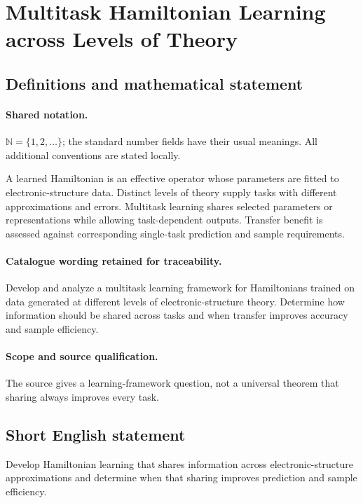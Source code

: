 \documentclass[11pt]{article}
\begin{document}
\section{Multitask Hamiltonian Learning across Levels of Theory}\label{statement}

\subsection{Definitions and mathematical statement}

\paragraph{Shared notation.}$\mathbb N=\{1,2,\ldots\}$; the standard number fields have their usual meanings. All additional conventions are stated locally.


A learned Hamiltonian is an effective operator whose parameters are fitted to electronic-structure data. Distinct levels of theory supply tasks with different approximations and errors. Multitask learning shares selected parameters or representations while allowing task-dependent outputs. Transfer benefit is assessed against corresponding single-task prediction and sample requirements.

\paragraph{Catalogue wording retained for traceability.}
Develop and analyze a multitask learning framework for Hamiltonians trained on data generated at different levels of electronic-structure theory. Determine how information should be shared across tasks and when transfer improves accuracy and sample efficiency.

\paragraph{Scope and source qualification.}The source gives a learning-framework question, not a universal theorem that sharing always improves every task.
\subsection{Short English statement}
Develop Hamiltonian learning that shares information across electronic-structure approximations and determine when that sharing improves prediction and sample efficiency.
\end{document}
